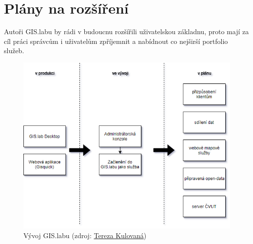 \section{Plány na rozšíření}
\label{vision}

Autoři GIS.labu by rádi v budoucnu rozšířili uživatelskou základnu, proto mají za cíl práci správcům i uživatelům zpříjemnit a nabídnout co nejširší portfolio služeb.

\begin{figure}[H] \centering
    \includegraphics[width=350pt]{./pictures/gislab_road_map.png}
    \caption[Vývoj GIS.labu]{Vývoj GIS.labu (zdroj:
	\href{}{Tereza Kulovaná})}
    \label{fig:gislab-roadmap}
\end{figure}

